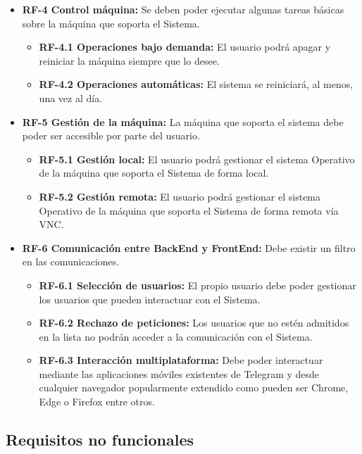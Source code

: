 \begin{itemize}
    \item \textbf{RF-4 Control máquina:} Se deben poder ejecutar algunas tareas básicas sobre la máquina que soporta el Sistema.
    \begin{itemize}
        \item \textbf{RF-4.1 Operaciones bajo demanda:} El usuario podrá apagar y reiniciar la máquina siempre que lo desee.
        \item \textbf{RF-4.2 Operaciones automáticas:} El sistema se reiniciará, al menos, una vez al día.
    \end{itemize}   
    
    \item \textbf{RF-5 Gestión de la máquina:} La máquina que soporta el sistema debe poder ser accesible por parte del usuario.
    \begin{itemize}
        \item \textbf{RF-5.1 Gestión local:} El usuario podrá gestionar el sistema Operativo de la máquina que soporta el Sistema de forma local.
        \item \textbf{RF-5.2 Gestión remota:} El usuario podrá gestionar el sistema Operativo de la máquina que soporta el Sistema de forma remota vía VNC.
    \end{itemize}
    
    \item \textbf{RF-6 Comunicación entre BackEnd y FrontEnd:} Debe existir un filtro en las comunicaciones.
    \begin{itemize}
        \item \textbf{RF-6.1 Selección de usuarios:} El propio usuario debe poder gestionar los usuarios que pueden interactuar con el Sistema.
        \item \textbf{RF-6.2 Rechazo de peticiones:} Los usuarios que no estén admitidos en la lista no podrán acceder a la comunicación con el Sistema.
        \item \textbf{RF-6.3 Interacción multiplataforma:} Debe poder interactuar mediante las aplicaciones móviles existentes de Telegram y desde cualquier navegador popularmente extendido como pueden ser Chrome, Edge o Firefox entre otros. 
    \end{itemize}
\end{itemize}

\subsection{\textbf{Requisitos no funcionales}}

